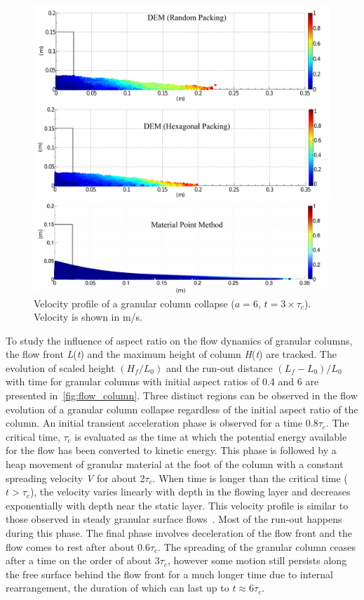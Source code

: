 \begin{figure}[tbhp]
\centering
\includegraphics[width=\textwidth]{a6f}
\caption[Velocity profile of a granular column collapse ($a = 6$, 
$t=3\times\tau_c$).]{Velocity profile of a granular column collapse ($a = 6$, 
$t=3\times\tau_c$). Velocity is shown in m/s.}
\label{fig:a6f}
\end{figure}

To study the influence of aspect ratio on the flow dynamics of granular 
columns, the flow front \textit{L}(\textit{t}) and the maximum height of column 
\textit{H}(\textit{t}) are tracked. The evolution of scaled height 
$(H_{{f}}/L_{0})$ and the run-out distance 
$(L_{{f}}-L_{0})/L_{0}$ with time for granular columns 
with initial aspect ratios of 0.4 and 6 are presented 
in~\cref{fig:flow_column}. Three distinct regions can be observed in the flow 
evolution of a granular column collapse regardless of the initial aspect ratio 
of the column. An initial transient acceleration phase is observed for a time 
0.8$\tau_{c}$. The critical time, $\tau_c$ is evaluated as the time at which 
the potential energy available for the flow has been converted to kinetic 
energy. This phase is followed by a heap movement of granular material at the 
foot of the column with a constant spreading velocity \textit{V} for about 
2$\tau_{c}$. When time is longer than the critical time ($t > \tau_{c}$), the 
velocity varies linearly with depth in the flowing layer and decreases 
exponentially with depth near the static layer. This velocity profile is 
similar to those observed in steady granular surface 
flows~\citep{Lajeunesse2004}. Most of the run-out happens during this phase. 
The final phase involves deceleration of the flow front and the flow comes to 
rest after about 0.6$\tau_{c}$. The spreading of the granular column ceases 
after a time on the order of about 3$\tau_{c}$, however some motion still 
persists along the free surface behind the flow front for a much longer time 
due to internal rearrangement, the duration of which can last up to $\textit{t} 
\approx 6\tau_{c}$. 

